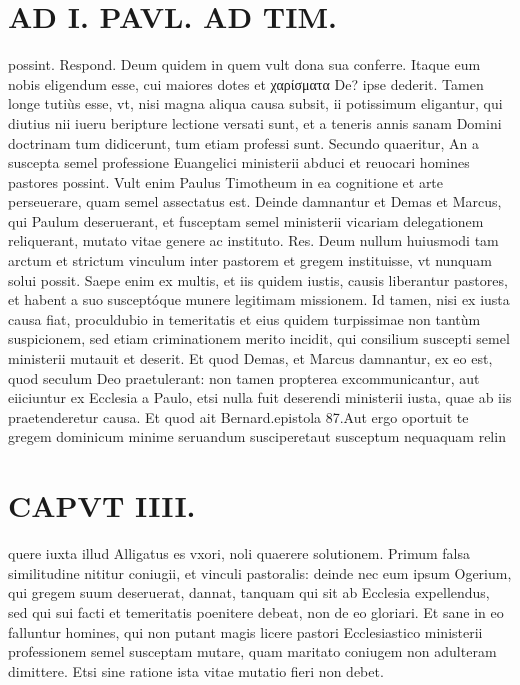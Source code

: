 \documentclass{article}
\begin{document}
\begin{pages}
\section*{AD I. PAVL. AD TIM. }
\marginpar{[ p.202 ]}\pstart possint. Respond. Deum quidem in quem vult dona sua conferre. Itaque eum nobis eligendum esse, cui maiores dotes et χαρίσματα De? ipse dederit. Tamen longe tutiùs esse, vt, nisi magna aliqua causa subsit, ii potissimum eligantur, qui diutius nii iueru beripture lectione versati sunt, et a teneris annis sanam Domini doctrinam tum didicerunt, tum etiam professi sunt.  \pend\pstart Secundo quaeritur, An a suscepta semel professione Euangelici ministerii abduci et reuocari homines pastores possint. Vult enim Paulus Timotheum in ea cognitione et arte perseuerare, quam semel assectatus est. Deinde damnantur et Demas et Marcus, qui Paulum deseruerant, et fusceptam semel ministerii vicariam delegationem reliquerant, mutato vitae genere ac instituto. Res. Deum nullum huiusmodi tam arctum et strictum vinculum inter pastorem et gregem instituisse, vt nunquam solui possit. Saepe enim ex multis, et iis quidem iustis, causis liberantur pastores, et habent a suo susceptóque munere legitimam missionem. Id tamen, nisi ex iusta causa fiat, proculdubio in temeritatis et eius quidem turpissimae non tantùm suspicionem, sed etiam criminationem merito incidit, qui consilium suscepti semel ministerii mutauit et deserit. Et quod Demas, et Marcus damnantur, ex eo est, quod seculum Deo praetulerant: non tamen propterea excommunicantur, aut eiiciuntur ex Ecclesia a Paulo, etsi nulla fuit deserendi ministerii iusta, quae ab iis praetenderetur causa. Et quod ait Bernard.epistola 87.Aut ergo oportuit te gregem dominicum minime seruandum susciperetaut susceptum nequaquam relin\pend
\section*{CAPVT  IIII. }
\marginpar{[ p.203 ]}\pstart quere iuxta illud Alligatus es vxori, noli quaerere solutionem. Primum falsa similitudine nititur coniugii, et vinculi pastoralis: deinde nec eum ipsum Ogerium, qui gregem suum deseruerat, dannat, tanquam qui sit ab Ecclesia expellendus, sed qui sui facti et temeritatis poenitere debeat, non de eo gloriari. Et sane in eo falluntur homines, qui non putant magis licere pastori Ecclesiastico ministerii professionem semel susceptam mutare, quam maritato coniugem non adulteram dimittere. Etsi sine ratione ista vitae mutatio fieri non debet.  \pend
{}
{}

\end{pages}
\end{document}
